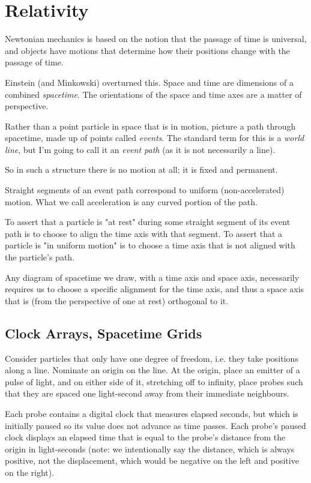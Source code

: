 \chapter{Relativity}

Newtonian mechanics is based on the notion that the passage of time is universal, and objects have motions that determine how their positions change with the passage of time.

Einstein (and Minkowski) overturned this. Space and time are dimensions of a combined \textit{spacetime}. The orientations of the space and time axes are a matter of perspective.

Rather than a point particle in space that is in motion, picture a path through spacetime, made up of points called \textit{events}. The standard term for this is a \textit{world line}, but I'm going to call it an \textit{event path} (as it is not necessarily a line).

So in such a structure there is no motion at all; it is fixed and permanent.

Straight segments of an event path correspond to uniform (non-accelerated) motion. What we call acceleration is any curved portion of the path.

To assert that a particle is "at rest" during some straight segment of its event path is to choose to align the time axis with that segment. To assert that a particle is "in uniform motion" is to choose a time axis that is not aligned with the particle's path.

Any diagram of spacetime we draw, with a time axis and space axis, necessarily requires us to choose a specific alignment for the time axis, and thus a space axis that is (from the perspective of one at rest) orthogonal to it.

\section{Clock Arrays, Spacetime Grids}

Consider particles that only have one degree of freedom, i.e. they take positions along a line. Nominate an origin on the line. At the origin, place an emitter of a pulse of light, and on either side of it, stretching off to infinity, place probes such that they are spaced one light-second away from their immediate neighbours.

Each probe contains a digital clock that measures elapsed seconds, but which is initially paused so its value does not advance as time passes. Each probe's paused clock displays an elapsed time that is equal to the probe's distance from the origin in light-seconds (note: we intentionally say the distance, which is always positive, not the displacement, which would be negative on the left and positive on the right).

